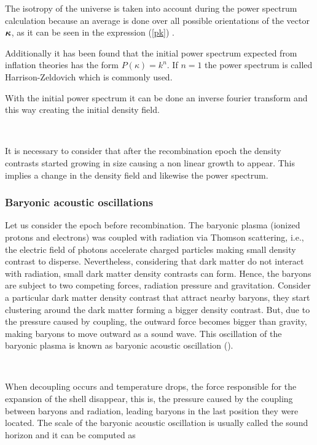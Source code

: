 \documentclass[a4,useAMS,usegraphicx,12pt]{article}
\begin{document}
The isotropy of the universe is taken into account during the power spectrum calculation because an average is done over
all  possible orientations of the vector ${\mbox{\boldmath$\kappa$}}$, as it can be seen in the expression (\ref{pk}) . 


 Additionally it has been found that the initial power spectrum 
expected from inflation theories has the form $P(\kappa)= k^n$. If $n=1$ the power spectrum is called 
Harrison-Zeldovich which is commonly used. 


With the initial power spectrum it can be done an inverse fourier transform and this way creating the initial 
density field. 

\

It is necessary to consider that after the recombination epoch the density contrasts started growing in size 
causing a non linear growth to appear. This implies a change in the density field and likewise the power spectrum. 

\subsubsection*{ Baryonic acoustic oscillations }

Let us consider the epoch before recombination. The baryonic plasma (ionized protons and electrons) was coupled with radiation via 
Thomson scattering,  i.e., the electric field of photons accelerate charged particles making small density contrast to disperse. Nevertheless,
considering that dark matter do not interact with radiation, small dark matter density contrasts can form. Hence, the baryons are 
subject to two competing forces, radiation pressure and gravitation. Consider a particular dark matter density contrast that attract
nearby baryons, they start clustering around the dark matter forming a bigger density contrast. But, due to the pressure caused
by coupling, the outward force becomes bigger than gravity, making baryons to move outward as a sound wave. This oscillation 
of the baryonic plasma is known as baryonic acoustic oscillation (\cite{pilar}). 

\

When decoupling occurs and temperature drops, the force responsible for the expansion of the shell disappear, this is, 
the pressure caused by the coupling between baryons and radiation, leading baryons in the last position they were located. 
The scale of the baryonic acoustic oscillation is 
usually called the sound horizon and it can be computed as
\end{document}
